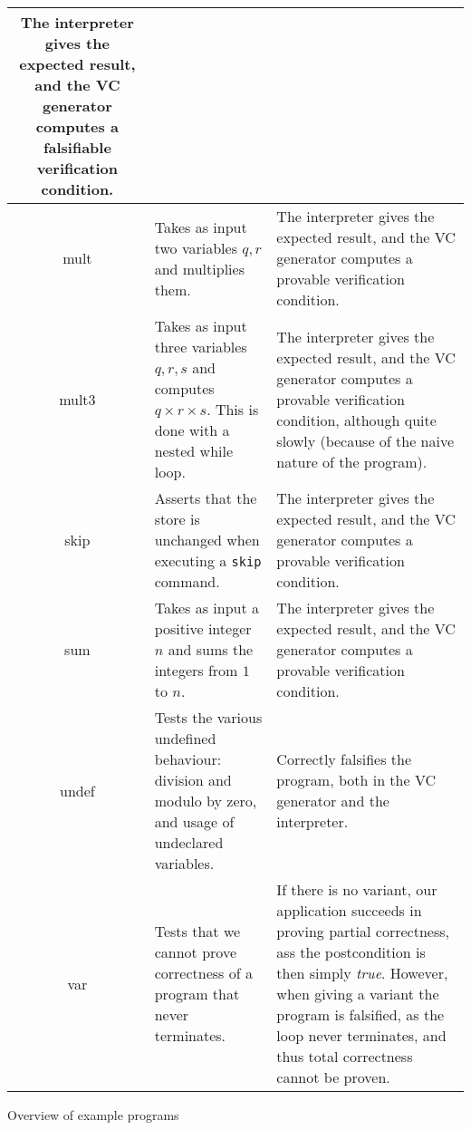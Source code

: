\begin{longtable}{|c|p{4.4cm}|p{4.4cm}|}
   The interpreter gives the expected result, and the VC generator computes a falsifiable verification condition. \\
 	\hline
 	mult &
   Takes as input two variables $q,r$ and multiplies them. & 
   The interpreter gives the expected result, and the VC generator computes a provable verification condition. \\
 	\hline
 	mult3 &
   Takes as input three variables $q,r,s$ and computes $q \times r \times s$. This is done with a nested while loop. & 
   The interpreter gives the expected result, and the VC generator computes a provable verification condition, although quite slowly (because of the naive nature of the program). \\
 	\hline
 	skip &
   Asserts that the store is unchanged when executing a \texttt{skip} command. & 
   The interpreter gives the expected result, and the VC generator computes a provable verification condition. \\
 	\hline
 	sum & 
   Takes as input a positive integer $n$ and sums the integers from $1$ to $n$. & 
   The interpreter gives the expected result, and the VC generator computes a provable verification condition. \\
 	\hline
 	undef & 
   Tests the various undefined behaviour: division and modulo by zero, and usage of undeclared variables. &
   Correctly falsifies the program, both in the VC generator and the interpreter. \\
 	\hline
 	var & 
   Tests that we cannot prove correctness of a program that never terminates. &
	 If there is no variant, our application succeeds in proving partial correctness, ass the postcondition is then simply \textit{true}. However, when giving a variant the program is falsified, as the loop never terminates, and thus total correctness cannot be proven. \\
 	\hline
\end{longtable}
\caption{Overview of example programs}
\label{table:testprograms}
